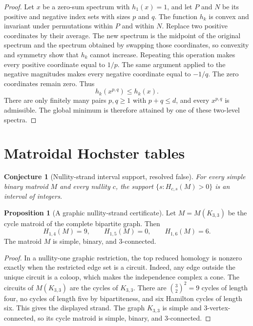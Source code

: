 \documentclass[11pt]{article}
\newtheorem{conjecture}{Conjecture}
\theoremstyle{definition}
\newtheorem{proposition}{Proposition}
\begin{document}
\begin{proof}
Let $x$ be a zero-sum spectrum with $h_1(x)=1$, and let $P$ and $N$ be its positive and negative index sets with sizes $p$ and $q$.  The function $h_k$ is convex and invariant under permutations within $P$ and within $N$.  Replace two positive coordinates by their average.  The new spectrum is the midpoint of the original spectrum and the spectrum obtained by swapping those coordinates, so convexity and symmetry show that $h_k$ cannot increase.  Repeating this operation makes every positive coordinate equal to $1/p$.  The same argument applied to the negative magnitudes makes every negative coordinate equal to $-1/q$.  The zero coordinates remain zero.  Thus
\[
h_k(x^{p,q})\le h_k(x).
\]
There are only finitely many pairs $p,q\ge1$ with $p+q\le d$, and every $x^{p,q}$ is admissible.  The global minimum is therefore attained by one of these two-level spectra.
\end{proof}

\section{Matroidal Hochster tables}

\begin{conjecture}[Nullity-strand interval support, resolved false]\label{y17}
For every simple binary matroid $M$ and every nullity $c$, the support $\{s:H_{c,s}(M)>0\}$ is an interval of integers.
\end{conjecture}

\begin{proposition}[A graphic nullity-strand certificate]\label{y:k33}
Let $M=M(K_{3,3})$ be the cycle matroid of the complete bipartite graph.  Then
\[
H_{1,4}(M)=9,\qquad H_{1,5}(M)=0,\qquad H_{1,6}(M)=6.
\]
The matroid $M$ is simple, binary, and $3$-connected.
\end{proposition}

\begin{proof}
In a nullity-one graphic restriction, the top reduced homology is nonzero exactly when the restricted edge set is a circuit.  Indeed, any edge outside the unique circuit is a coloop, which makes the independence complex a cone.  The circuits of $M(K_{3,3})$ are the cycles of $K_{3,3}$.  There are $\binom32^2=9$ cycles of length four, no cycles of length five by bipartiteness, and six Hamilton cycles of length six.  This gives the displayed strand.  The graph $K_{3,3}$ is simple and $3$-vertex-connected, so its cycle matroid is simple, binary, and $3$-connected.
\end{proof}
\end{document}
